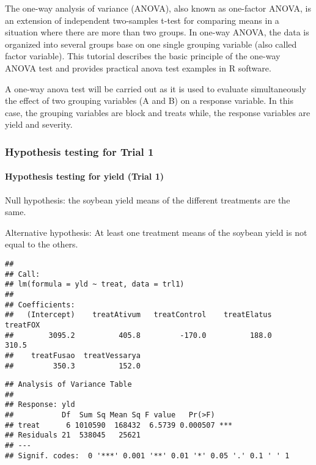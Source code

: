 \documentclass[
]{article}
\begin{document}
The one-way analysis of variance (ANOVA), also known as one-factor
ANOVA, is an extension of independent two-samples t-test for comparing
means in a situation where there are more than two groups. In one-way
ANOVA, the data is organized into several groups base on one single
grouping variable (also called factor variable). This tutorial describes
the basic principle of the one-way ANOVA test and provides practical
anova test examples in R software.

A one-way anova test will be carried out as it is used to evaluate
simultaneously the effect of two grouping variables (A and B) on a
response variable. In this case, the grouping variables are block and
treats while, the response variables are yield and severity.

\hypertarget{hypothesis-testing-for-trial-1}{%
\subsubsection{Hypothesis testing for Trial
1}\label{hypothesis-testing-for-trial-1}}

\hypertarget{hypothesis-testing-for-yield-trial-1}{%
\paragraph{Hypothesis testing for yield (Trial
1)}\label{hypothesis-testing-for-yield-trial-1}}

Null hypothesis: the soybean yield means of the different treatments are
the same.

Alternative hypothesis: At least one treatment means of the soybean
yield is not equal to the others.

\begin{verbatim}
## 
## Call:
## lm(formula = yld ~ treat, data = trl1)
## 
## Coefficients:
##   (Intercept)    treatAtivum   treatControl    treatElatus       treatFOX  
##        3095.2          405.8         -170.0          188.0          310.5  
##    treatFusao  treatVessarya  
##         350.3          152.0
\end{verbatim}

\begin{verbatim}
## Analysis of Variance Table
## 
## Response: yld
##           Df  Sum Sq Mean Sq F value   Pr(>F)    
## treat      6 1010590  168432  6.5739 0.000507 ***
## Residuals 21  538045   25621                     
## ---
## Signif. codes:  0 '***' 0.001 '**' 0.01 '*' 0.05 '.' 0.1 ' ' 1
\end{verbatim}
\end{document}
